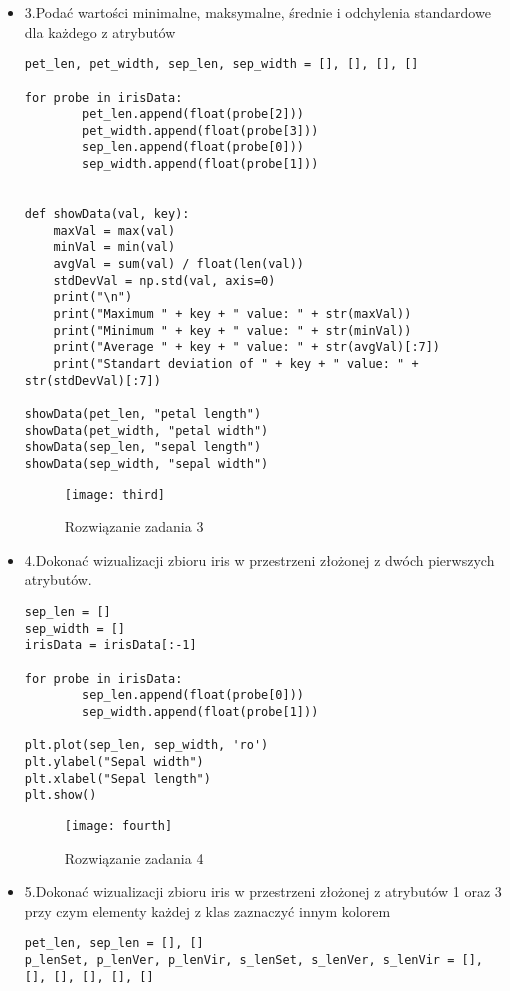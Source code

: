 \documentclass[12pt,a4paper]{article}
\begin{document}
\begin{itemize}
                \item 3.Podać wartości minimalne, maksymalne, średnie i odchylenia standardowe dla każdego z atrybutów
	\begin{lstlisting}
pet_len, pet_width, sep_len, sep_width = [], [], [], []

for probe in irisData:
        pet_len.append(float(probe[2]))
        pet_width.append(float(probe[3]))
        sep_len.append(float(probe[0]))
        sep_width.append(float(probe[1]))


def showData(val, key):
    maxVal = max(val)
    minVal = min(val)
    avgVal = sum(val) / float(len(val))
    stdDevVal = np.std(val, axis=0)
    print("\n")
    print("Maximum " + key + " value: " + str(maxVal))
    print("Minimum " + key + " value: " + str(minVal))
    print("Average " + key + " value: " + str(avgVal)[:7])
    print("Standart deviation of " + key + " value: " + str(stdDevVal)[:7])

showData(pet_len, "petal length")
showData(pet_width, "petal width")
showData(sep_len, "sepal length")
showData(sep_width, "sepal width")
	\end{lstlisting}
		\begin{figure}[h]
                        \texttt{[image: third]}
                        \centering
			\caption{Rozwiązanie zadania 3}
			\label{fig:fig3}
                \end{figure}
                \clearpage

                \item 4.Dokonać wizualizacji zbioru iris w przestrzeni złożonej z dwóch pierwszych atrybutów.
	\begin{lstlisting}
sep_len = []
sep_width = []
irisData = irisData[:-1]

for probe in irisData:
        sep_len.append(float(probe[0]))
        sep_width.append(float(probe[1]))

plt.plot(sep_len, sep_width, 'ro')
plt.ylabel("Sepal width")
plt.xlabel("Sepal length")
plt.show()
	\end{lstlisting}
		\begin{figure}[h]
                        \texttt{[image: fourth]}
                        \centering
			\caption{Rozwiązanie zadania 4}
			\label{fig:fig4}
                \end{figure}
                \clearpage

        \item 5.Dokonać wizualizacji zbioru iris w przestrzeni złożonej z atrybutów 1 oraz 3 przy czym elementy każdej z klas zaznaczyć innym kolorem
	\begin{lstlisting}
pet_len, sep_len = [], []
p_lenSet, p_lenVer, p_lenVir, s_lenSet, s_lenVer, s_lenVir = [], [], [], [], [], []


\end{lstlisting}
\end{itemize}
\end{document}
